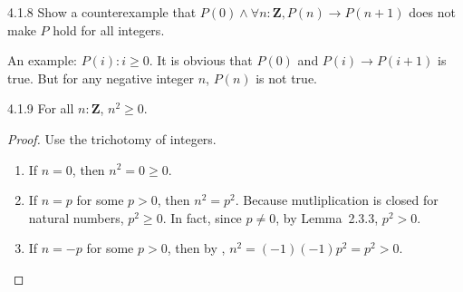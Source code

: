 \begin{exercise}{4.1.8}
	Show a counterexample that $P(0) \land \forall n : \mathbf{Z}, P(n) \to
	P(n+1)$ does not make $P$ hold for all integers.
\end{exercise}
An example: $P(i): i \ge 0$. It is obvious that $P(0)$ and $P(i) \rightarrow
P(i+1)$ is true. But for any negative integer $n$, $P(n)$ is not true.

\begin{exercise}{4.1.9}
For all $n : \mathbf{Z}$, $n^2 \ge 0$.
\end{exercise}
\begin{proof}
	Use the trichotomy of integers.

	\begin{enumerate}
	\item If $n = 0$, then $n^2 = 0 \ge 0$.
	\item If $n = p$ for some $p > 0$, then $n^2 = p^2$. Because mutliplication
		is closed for natural numbers, $p^2 \ge 0$. In fact, since $p \ne 0$, by
		Lemma~2.3.3, $p^2 > 0$.
	\item If $n = -p$ for some $p > 0$, then by , $n^2 =
		(-1)(-1)p^2 = p^2 > 0$.
	\end{enumerate}
\end{proof}

